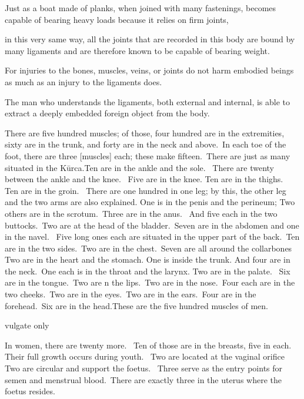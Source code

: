 \begin{translation}
\item[33]
Just as a boat made of planks, when joined with many fastenings, becomes capable of bearing heavy loads because it relies on firm joints, 

\item[34]
in this very same way, all the joints that are recorded in this body are bound by many ligaments and are therefore known to be capable of bearing weight. 


\item[35]
For injuries to the bones, muscles, veins, or joints do not harm embodied beings as much as an injury to the ligaments does. 

\item[36]
The man who understands the ligaments, both external and internal, is able to extract a deeply embedded foreign object from the body. 

\item[37]
There are five hundred muscles; of those, four hundred are in the extremities, sixty are in the trunk, and forty are in the neck and above. In each toe of the foot, there are three [muscles] each; these make fifteen. There are just as many situated in the Kūrca.Ten are in the ankle and the sole.  There are twenty between the ankle and the knee.  Five are in the knee. Ten are in the thighs.  Ten are in the groin.  There are one hundred in one leg; by this, the other leg and the two arms are also explained. One is in the penis and the perineum; Two others are in the scrotum. Three are in the anus.  And five each in the two buttocks. Two are at the head of the bladder. Seven are in the abdomen and one in the navel.  Five long ones each are situated in the upper part of the back. Ten are in the two sides. Two are in the chest. Seven are all around the collarbones Two are in the heart and the stomach. One is inside the trunk. And four are in the neck. One each is in the throat and the larynx. Two are in the palate.  Six are in the tongue. Two are  n the lips. Two are in the nose. Four each are in the two cheeks. Two are in the eyes. Two are in the ears. Four are in the forehead. Six are in the head.These are the five hundred muscles of men. 

\item[38]  vulgate only

\item[39]
In women, there are twenty more.  Ten of those are in the breasts, five in each. 
Their full growth occurs during youth.  Two are located at the vaginal orifice
Two are circular and support the foetus.  Three serve as the entry points for semen and menstrual blood. There are exactly three in the uterus where the foetus resides. 


\end{translation}
